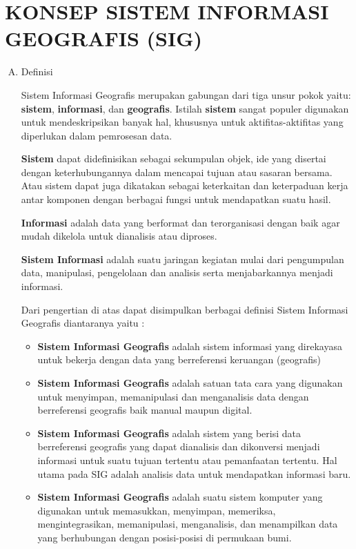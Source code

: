 \chapter{KONSEP SISTEM INFORMASI GEOGRAFIS (SIG)}

\begin{enumerate}[A.]
\item{Definisi}

Sistem Informasi Geografis merupakan gabungan dari tiga unsur pokok yaitu: \textbf{sistem}, \textbf{informasi}, dan \textbf{geografis}. Istilah \textbf{sistem} sangat populer digunakan untuk mendeskripsikan banyak hal, khususnya untuk aktifitas-aktifitas yang diperlukan dalam pemrosesan data.

\textbf{Sistem} dapat didefinisikan sebagai sekumpulan objek, ide yang disertai dengan keterhubungannya dalam mencapai tujuan atau sasaran bersama. Atau sistem dapat juga dikatakan sebagai keterkaitan dan keterpaduan kerja antar komponen dengan berbagai fungsi untuk mendapatkan suatu hasil.

\textbf{Informasi} adalah data yang berformat dan terorganisasi dengan baik agar mudah dikelola untuk dianalisis atau diproses.

\textbf{Sistem Informasi} adalah suatu jaringan kegiatan mulai dari pengumpulan data, manipulasi, pengelolaan dan analisis serta menjabarkannya menjadi informasi.

Dari pengertian di atas dapat disimpulkan berbagai definisi Sistem Informasi Geografis diantaranya yaitu :

\begin{itemize}

\item \textbf{Sistem Informasi Geografis} adalah sistem informasi yang direkayasa untuk bekerja dengan data yang berreferensi keruangan (geografis)

\item \textbf{Sistem Informasi Geografis} adalah satuan tata cara yang digunakan untuk menyimpan, memanipulasi dan menganalisis data dengan berreferensi geografis baik manual maupun digital.

\item \textbf{Sistem Informasi Geografis} adalah sistem yang berisi data berreferensi geografis yang dapat dianalisis dan dikonversi menjadi informasi untuk suatu tujuan tertentu atau pemanfaatan tertentu. Hal utama pada SIG adalah analisis data untuk mendapatkan informasi baru.

\item \textbf{Sistem Informasi Geografis} adalah suatu sistem komputer yang digunakan untuk memasukkan, menyimpan, memeriksa, mengintegrasikan, memanipulasi, menganalisis, dan menampilkan data yang berhubungan dengan posisi-posisi di permukaan bumi.


\end{itemize}
\end{enumerate}

